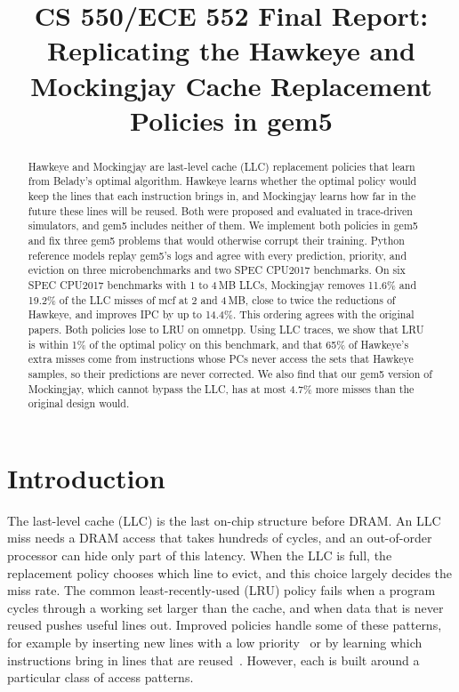 \documentclass[11pt,conference]{IEEEtran}
\begin{document}
\title{CS 550/ECE 552 Final Report:\\Replicating the Hawkeye and Mockingjay
Cache Replacement Policies in gem5}

\author{
}

\maketitle

\begin{abstract}
Hawkeye and Mockingjay are last-level cache (LLC) replacement policies that
learn from Belady's optimal algorithm. Hawkeye learns whether the optimal
policy would keep the lines that each instruction brings in, and Mockingjay
learns how far in the future these lines will be reused. Both were proposed
and evaluated in trace-driven simulators, and gem5 includes neither of them. We
implement both policies in gem5 and fix three gem5 problems that would
otherwise corrupt their training. Python reference models replay gem5's logs
and agree with every prediction, priority, and eviction on three
microbenchmarks and two SPEC CPU2017 benchmarks. On six SPEC CPU2017
benchmarks with 1 to 4\,MB LLCs, Mockingjay removes 11.6\% and 19.2\% of the
LLC misses of mcf at 2 and 4\,MB, close to twice the reductions of Hawkeye,
and improves IPC by up to 14.4\%. This ordering agrees with the original
papers. Both policies lose to LRU on omnetpp. Using LLC traces, we show that
LRU is within 1\% of the optimal policy on this benchmark, and that 65\% of
Hawkeye's extra misses come from instructions whose PCs never access the sets
that Hawkeye samples, so their predictions are never corrected. We also find
that our gem5 version of Mockingjay, which cannot bypass the LLC, has at most
4.7\% more misses than the original design would.
\end{abstract}

\section{Introduction}

The last-level cache (LLC) is the last on-chip structure before DRAM. An LLC
miss needs a DRAM access that takes hundreds of cycles, and an out-of-order
processor can hide only part of this latency. When the LLC is full, the
replacement policy chooses which line to evict, and this choice largely decides
the miss rate. The common least-recently-used (LRU) policy fails when a program
cycles through a working set larger than the cache, and when data that is never
reused pushes useful lines out. Improved policies handle some of these
patterns, for example by inserting new lines with a low priority~\cite{rrip} or
by learning which instructions bring in lines that are reused~\cite{ship}.
However, each is built around a particular class of access patterns.
\end{document}
